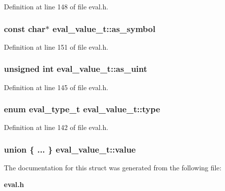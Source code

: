 Definition at line 148 of file eval.h.
\subsubsection[{as\_\-symbol}]{\setlength{\rightskip}{0pt plus 5cm}const char$\ast$ {\bf eval\_\-value\_\-t::as\_\-symbol}}\label{structeval__value__t_954288b68b2366ce38384350a9e82470}




Definition at line 151 of file eval.h.
\subsubsection[{as\_\-uint}]{\setlength{\rightskip}{0pt plus 5cm}unsigned int {\bf eval\_\-value\_\-t::as\_\-uint}}\label{structeval__value__t_36041717ef349c5b98da264b8ecfd851}




Definition at line 145 of file eval.h.
\subsubsection[{type}]{\setlength{\rightskip}{0pt plus 5cm}enum {\bf eval\_\-type\_\-t} {\bf eval\_\-value\_\-t::type}}\label{structeval__value__t_3fc795a4c2dc52b00fee5fde0bbe6c75}




Definition at line 142 of file eval.h.
\subsubsection[{value}]{\setlength{\rightskip}{0pt plus 5cm}union \{ ... \}   {\bf eval\_\-value\_\-t::value}}\label{structeval__value__t_201201a8cf9db70269a20b00bb67596b}




The documentation for this struct was generated from the following file:\begin{CompactItemize}
\item 
{\bf eval.h}\end{CompactItemize}
